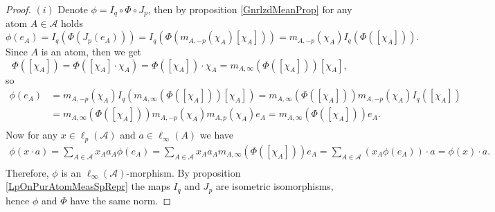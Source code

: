 \documentclass[12pt]{article}
\begin{document}
\begin{proof} 
    $(i)$ Denote $\phi=I_q\circ \Phi\circ J_p$, then by 
    proposition \ref{GnrlzdMeanProp} for any atom $A\in\mathcal{A}$ holds
    \[
        \phi(e_A)
        =I_q(\Phi(J_p(e_A)))
        =I_q(\Phi(m_{A,-p}(\chi_A)[\chi_A]))
        =m_{A,-p}(\chi_A)I_q(\Phi([\chi_A])).
    \]
    Since $A$ is an atom, then  we get
    \[
        \Phi([\chi_A])
        =\Phi([\chi_A]\cdot\chi_A)
        =\Phi([\chi_A])\cdot\chi_A
        =m_{A,\infty}(\Phi([\chi_A]))[\chi_A],
    \]
    so
    \[
    \begin{aligned}
        \phi(e_A)
        &=m_{A,-p}(\chi_A)I_q(m_{A,\infty}(\Phi([\chi_A]))[\chi_A]) 
        =m_{A,\infty}(\Phi([\chi_A]))m_{A,-p}(\chi_A)I_q([\chi_A]) \\
        &=m_{A,\infty}(\Phi([\chi_A]))m_{A,-p}(\chi_A)m_{A,p}(\chi_A)e_A 
        =m_{A,\infty}(\Phi([\chi_A]))e_A. \\
    \end{aligned}
    \]
    Now for any $x\in\ell_p(\mathcal{A})$ and $a\in\ell_\infty(A)$ we have
    \[
    \begin{aligned}
        \phi(x\cdot a)
        =\sum_{A\in\mathcal{A}} x_A a_A \phi(e_A) 
        =\sum_{A\in\mathcal{A}} x_A a_A m_{A,\infty}(\Phi([\chi_A]))e_A 
        =\sum_{A\in\mathcal{A}} (x_A \phi(e_A))\cdot a 
        =\phi(x)\cdot a. \\
    \end{aligned}
    \]
    Therefore, $\phi$ is an $\ell_\infty(\mathcal{A})$-morphism. By 
    proposition \ref{LpOnPurAtomMeasSpRepr} the maps $I_q$ and $J_p$ are 
    isometric isomorphisms, hence $\phi$ and $\Phi$ have the same norm.


\end{proof}
\end{document}
